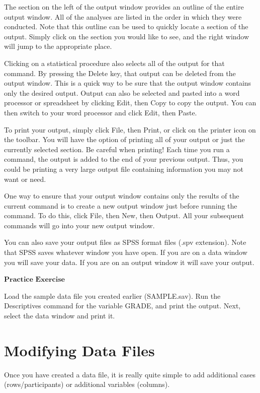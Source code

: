 \documentclass[
]{book}
\begin{document}
The section on the left of the output window provides an outline of the entire output window. All of the analyses are listed in the order in which they were conducted. Note that this outline can be used to quickly locate a section of the output. Simply click on the section you would like to see, and the right window will jump to the appropriate place.

Clicking on a statistical procedure also selects all of the output for that command. By pressing the Delete key, that output can be deleted from the output window. This is a quick way to be sure that the output window contains only the desired output. Output can also be selected and pasted into a word processor or spreadsheet by clicking Edit, then Copy to copy the output. You can then switch to your word processor and click Edit, then Paste.

To print your output, simply click File, then Print, or click on the printer icon on the toolbar. You will have the option of printing all of your output or just the currently selected section. Be careful when printing! Each time you run a command, the output is added to the end of your previous output. Thus, you could be printing a very large output file containing information you may not want or need.

One way to ensure that your output window contains only the results of the current command is to create a new output window just before running the command. To do this, click File, then New, then Output. All your subsequent commands will go into your new output window.

You can also save your output files as SPSS format files (.spv extension). Note that SPSS saves whatever window you have open. If you are on a data window you will save your data. If you are on an output window it will save your output.

\(\textbf{Practice Exercise}\)

Load the sample data file you created earlier (SAMPLE.sav). Run the Descriptives command for the variable GRADE, and print the output. Next, select the data window and print it.

\hypertarget{modifying-data-files}{%
\section{Modifying Data Files}\label{modifying-data-files}}

Once you have created a data file, it is really quite simple to add additional cases (rows/participants) or additional variables (columns).
\end{document}
